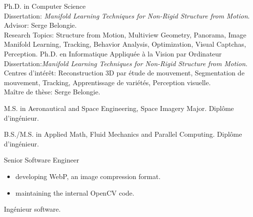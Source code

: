 \documentclass{article}
\begin{document}


\begin{llist}

 
{
Ph.D. in Computer Science\\
Dissertation: \textit{Manifold Learning Techniques for Non-Rigid Structure from
Motion}.\\
Advisor: Serge Belongie.\\
Research Topics: Structure from Motion, Multiview Geometry, Panorama, Image Manifold Learning, Tracking, Behavior 
Analysis, Optimization, Visual Captchas, Perception.
}
{
Ph.D. en Informatique Appliqu\'{e}e \`{a} la Vision par Ordinateur\\
Dissertation:\textit{Manifold Learning Techniques for Non-Rigid Structure from
Motion}.\\
Centres d'int\'{e}r\^{e}t: Reconstruction 3D par \'{e}tude de mouvement, Segmentation de mouvement, Tracking, 
Apprentissage de vari\'{e}t\'{e}s, Perception visuelle.\\
Ma\^{i}tre de th\`{e}se: Serge Belongie.
}

 
{
M.S. in Aeronautical and Space Engineering, Space Imagery Major.
}
{
Dipl\^{o}me d'ing\'{e}nieur.
}

 
{
B.S./M.S. in Applied Math, Fluid Mechanics and Parallel Computing.
}
{
Dipl\^{o}me d'ing\'{e}nieur.
}

{
}
{
}
\vspace{-0.33cm}

{
Senior Software Engineer
\vspace{-0.33cm}
\begin{itemize}
 \item developing WebP, an image compression format.
 \item maintaining the internal OpenCV code.
\end{itemize}
}
{
Ing\'{e}nieur software.
}


\end{llist}
\end{document}
